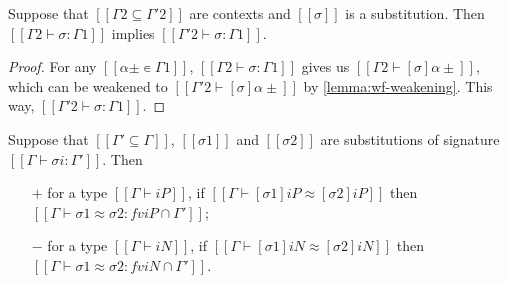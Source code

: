 \begin{lemma}
  \label{lemma:subst-range-weakening}
  Suppose that $[[Γ2 ⊆ Γ'2]]$ are contexts and 
  $[[σ]]$ is a substitution.
  Then $[[Γ2 ⊢ σ : Γ1]]$ implies $[[Γ'2 ⊢ σ : Γ1]]$.
\end{lemma}
\begin{proof}
  For any $[[α± ∊ Γ1]]$, 
  $[[Γ2 ⊢ σ : Γ1]]$ gives us  $[[ Γ2 ⊢ [σ]α± ]]$, which can be
  weakened to $[[ Γ'2 ⊢ [σ]α± ]]$ by \cref{lemma:wf-weakening}. 
  This way, $[[Γ'2 ⊢ σ : Γ1]]$.
\end{proof}

\begin{lemma}[]
  Suppose that $[[Γ' ⊆ Γ]]$,
  $[[σ1]]$ and $[[σ2]]$ are substitutions of signature $[[Γ ⊢ σi : Γ']]$.
  Then 
  \begin{enumerate}
    \item [$+$] for a type $[[Γ ⊢ iP]]$, if $[[Γ ⊢ [σ1]iP ≈ [σ2]iP]]$ then 
    $[[Γ ⊢ σ1 ≈ σ2 : fv iP ∩ Γ']]$;
    \item [$-$] for a type $[[Γ ⊢ iN]]$, if $[[Γ ⊢ [σ1]iN ≈ [σ2]iN]]$ then
    $[[Γ ⊢ σ1 ≈ σ2 : fv iN ∩ Γ']]$.
  \end{enumerate}
\end{lemma}
